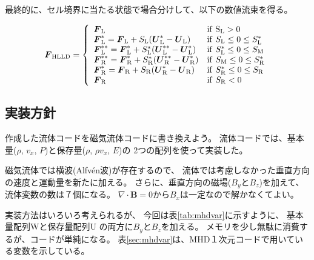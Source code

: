 最終的に、セル境界に当たる状態で場合分けして、以下の数値流束を得る。
\begin{screen}
\begin{equation}
    {\mbox{\boldmath $ F$}}_\mathrm{HLLD}
    =\left\{
    \begin{array}{ll}
         {\mbox{\boldmath $ F$}}_\mathrm{L} & \mathrm{if~S_\mathrm{L} > 0} \\
         {\mbox{\boldmath $ F$}}^*_\mathrm{L} =  {\mbox{\boldmath $ F$}}_\mathrm{L} + S_\mathrm{L} ({\mbox{\boldmath $ U$}}^*_\mathrm{L} -  {\mbox{\boldmath $ U$}}_\mathrm{L}) 
         & \mathrm{if}~S_\mathrm{L} \le 0 \le S^*_\mathrm{L} \\
         {\mbox{\boldmath $ F$}}^{**}_\mathrm{L} = {\mbox{\boldmath $ F$}}^*_\mathrm{L} + S^*_\mathrm{L} ({\mbox{\boldmath $ U$}}^{**}_\mathrm{L} -  {\mbox{\boldmath $ U$}}^*_\mathrm{L}) 
 & \mathrm{if}~S^*_\mathrm{L} \le 0 \le S_\mathrm{M} \\
         {\mbox{\boldmath $ F$}}^{**}_\mathrm{R} = {\mbox{\boldmath $ F$}}^*_\mathrm{R} + S^*_\mathrm{R} ({\mbox{\boldmath $ U$}}^{**}_\mathrm{R} -  {\mbox{\boldmath $ U$}}^*_\mathrm{R}) 
 & \mathrm{if}~S_\mathrm{M} \le 0 \le S^*_\mathrm{R} \\
         {\mbox{\boldmath $ F$}}^{*}_\mathrm{R} = {\mbox{\boldmath $ F$}}_\mathrm{R} + S_\mathrm{R} ({\mbox{\boldmath $ U$}}^*_\mathrm{R} -  {\mbox{\boldmath $ U$}}_\mathrm{R}) 
 & \mathrm{if}~S^*_\mathrm{R} \le 0 \le S_\mathrm{R} \\
         {\mbox{\boldmath $ F$}}_\mathrm{R} & \mathrm{if~}S_\mathrm{R} < 0 \\
    \end{array}
    \right.
\end{equation}
\end{screen}





\clearpage
\subsection{実装方針}

作成した流体コードを磁気流体コードに書き換えよう。
流体コードでは、基本量($\rho$, $v_x$, $P$)と保存量($\rho$, $\rho v_x$, $E$)の
2つの配列を使って実装した。

磁気流体では横波(Alfv\'en波)が存在するので、
流体では考慮しなかった垂直方向の速度と運動量を新たに加える。
さらに、垂直方向の磁場($B_y$と$B_z$)を加えて、流体変数の数は７個になる。
$\nabla\cdot\bm{B}=0$から$B_x$は一定なので解かなくてよい。

実装方法はいろいろ考えられるが、
今回は表\ref{tab:mhdvar}に示すように、
基本量配列{\ttfamily W}と保存量配列{\ttfamily U}
の両方に$B_y$と$B_z$を加える。
メモリを少し無駄に消費するが、コードが単純になる。
表\ref{sec:mhdvar}は、MHD１次元コードで用いている変数を示している。

